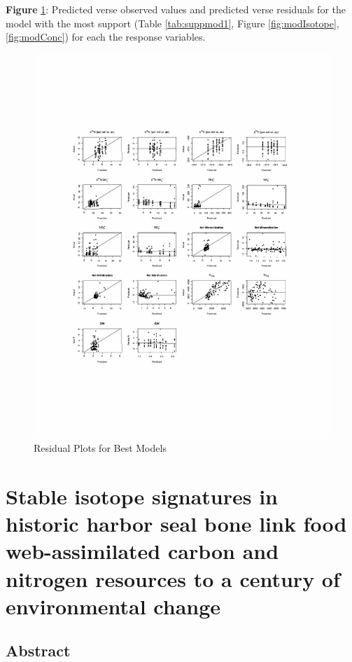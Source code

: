 \documentclass [11pt, proquest] {uwthesis}[2015/03/03]
\begin{document}
\textbf{Figure} \ref{fig:ch1resid}: Predicted verse observed values and
predicted verse residuals for the model with the most support (Table
\ref{tab:suppmod1}, Figure \ref{fig:modIsotope}, \ref{fig:modConc}) for
each the response variables. \newline 
\begin{figure}[h]
  \includegraphics[width=1\textwidth]{figure/Ch1/ch1residuals.pdf}
  \caption{Residual Plots for Best Models}
  \label{fig:ch1resid}
\end{figure}
\chapter{Stable isotope signatures in historic harbor seal bone link
food web-assimilated carbon and nitrogen resources to a century of
environmental
change}\label{stable-isotope-signatures-in-historic-harbor-seal-bone-link-food-web-assimilated-carbon-and-nitrogen-resources-to-a-century-of-environmental-change}

\section{Abstract}\label{abstract-1}
\end{document}
